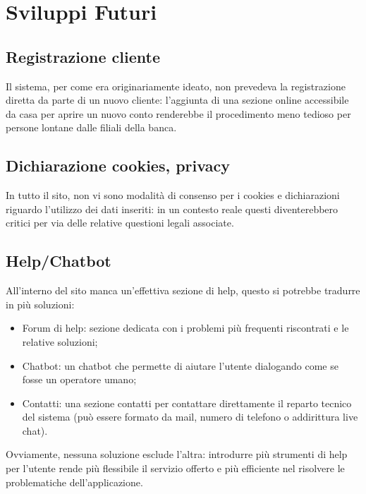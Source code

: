 \section{Sviluppi Futuri}
\subsection{Registrazione cliente}
Il sistema, per come era originariamente ideato, non prevedeva la registrazione diretta da parte di un nuovo cliente: l'aggiunta di una sezione online accessibile da casa per aprire un nuovo conto renderebbe il procedimento meno tedioso per persone lontane dalle filiali della banca.
\subsection{Dichiarazione cookies, privacy}
In tutto il sito, non vi sono modalità di consenso per i cookies e dichiarazioni riguardo l'utilizzo dei dati inseriti: in un contesto reale questi diventerebbero critici per via delle relative questioni legali associate.  
\subsection{Help/Chatbot}
All'interno del sito manca un'effettiva sezione di help, questo si potrebbe tradurre in più soluzioni:
\begin{itemize}
	\item Forum di help: sezione dedicata con i problemi più frequenti riscontrati e le relative soluzioni;
	\item Chatbot: un chatbot che permette di aiutare l'utente dialogando come se fosse un operatore umano;
	\item Contatti: una sezione contatti per contattare direttamente il reparto tecnico del sistema (può essere formato da mail, numero di telefono o addirittura live chat).
\end{itemize}
Ovviamente, nessuna soluzione esclude l'altra: introdurre più strumenti di help per l'utente rende più flessibile il servizio offerto e più efficiente nel risolvere le problematiche dell'applicazione.